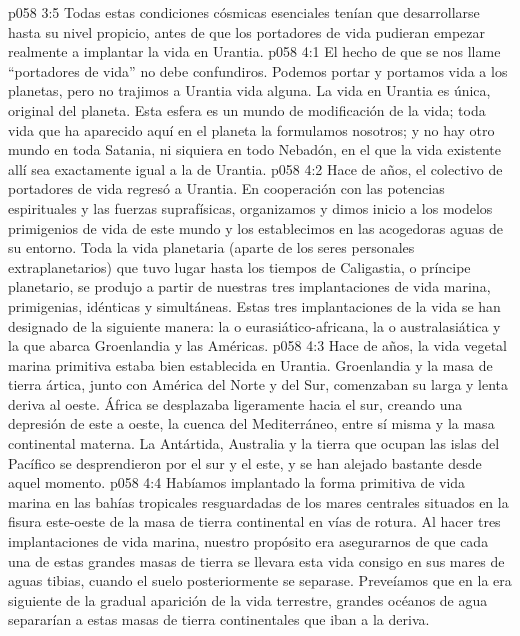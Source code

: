 \vs p058 3:5 \pc Todas estas condiciones cósmicas esenciales tenían que desarrollarse hasta su nivel propicio, antes de que los portadores de vida pudieran empezar realmente a implantar la vida en Urantia.
\vs p058 4:1 El hecho de que se nos llame “portadores de vida” no debe confundiros. Podemos portar y portamos vida a los planetas, pero no trajimos a Urantia vida alguna. La vida en Urantia es única, original del planeta. Esta esfera es un mundo de modificación de la vida; toda vida que ha aparecido aquí en el planeta la formulamos nosotros; y no hay otro mundo en toda Satania, ni siquiera en todo Nebadón, en el que la vida existente allí sea exactamente igual a la de Urantia.
\vs p058 4:2 \pc Hace  de años, el colectivo de portadores de vida regresó a Urantia. En cooperación con las potencias espirituales y las fuerzas suprafísicas, organizamos y dimos inicio a los modelos primigenios de vida de este mundo y los establecimos en las acogedoras aguas de su entorno. Toda la vida planetaria (aparte de los seres personales extraplanetarios) que tuvo lugar hasta los tiempos de Caligastia, o príncipe planetario, se produjo a partir de nuestras tres implantaciones de vida marina, primigenias, idénticas y simultáneas. Estas tres implantaciones de la vida se han designado de la siguiente manera: la  o eurasiático\hyp{}africana, la  o australasiática y la  que abarca Groenlandia y las Américas.
\vs p058 4:3 \pc Hace  de años, la vida vegetal marina primitiva estaba bien establecida en Urantia. Groenlandia y la masa de tierra ártica, junto con América del Norte y del Sur, comenzaban su larga y lenta deriva al oeste. África se desplazaba ligeramente hacia el sur, creando una depresión de este a oeste, la cuenca del Mediterráneo, entre sí misma y la masa continental materna. La Antártida, Australia y la tierra que ocupan las islas del Pacífico se desprendieron por el sur y el este, y se han alejado bastante desde aquel momento.
\vs p058 4:4 Habíamos implantado la forma primitiva de vida marina en las bahías tropicales resguardadas de los mares centrales situados en la fisura este\hyp{}oeste de la masa de tierra continental en vías de rotura. Al hacer tres implantaciones de vida marina, nuestro propósito era asegurarnos de que cada una de estas grandes masas de tierra se llevara esta vida consigo en sus mares de aguas tibias, cuando el suelo posteriormente se separase. Preveíamos que en la era siguiente de la gradual aparición de la vida terrestre, grandes océanos de agua separarían a estas masas de tierra continentales que iban a la deriva.
